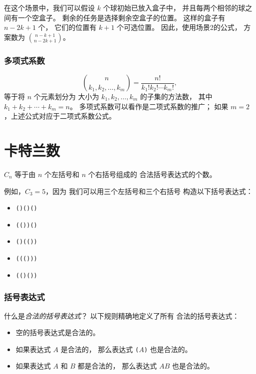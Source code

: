 在这个场景中，我们可以假设 $k$ 个球初始已放入盒子中，
并且每两个相邻的球之间有一个空盒子。
剩余的任务是选择剩余空盒子的位置。
这样的盒子有 $n-2k+1$ 个，
它们的位置有 $k+1$ 个可选位置。
因此，使用场景2的公式，
方案数为
${n-k+1 \choose n-2k+1}$。

\subsubsection{多项式系数}


\[ {n \choose k_1,k_2,\ldots,k_m} = \frac{n!}{k_1! k_2! \cdots k_m!}, \]
等于将 $n$ 个元素划分为
大小为 $k_1,k_2,\ldots,k_m$ 的子集的方法数，
其中 $k_1+k_2+\cdots+k_m=n$。
多项式系数可以看作是二项式系数的推广；
如果 $m=2$，上述公式对应于二项式系数公式。

\section{卡特兰数}


$C_n$ 等于由
$n$ 个左括号和 $n$ 个右括号组成的
合法括号表达式的个数。

例如，$C_3=5$，因为
我们可以用三个左括号和三个右括号
构造以下括号表达式：

\begin{itemize}[noitemsep]
\item \texttt{()()()}
\item \texttt{(())()}
\item \texttt{()(())}
\item \texttt{((()))}
\item \texttt{(()())}
\end{itemize}

\subsubsection{括号表达式}


什么是\emph{合法的括号表达式}？
以下规则精确地定义了所有
合法的括号表达式：

\begin{itemize}
\item 空的括号表达式是合法的。
\item 如果表达式 $A$ 是合法的，
那么表达式
\texttt{(}$A$\texttt{)} 也是合法的。
\item 如果表达式 $A$ 和 $B$ 都是合法的，
那么表达式 $AB$ 也是合法的。
\end{itemize}

